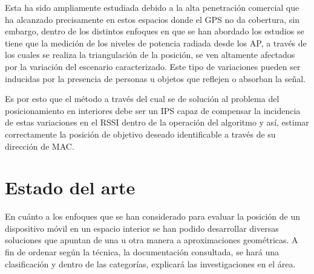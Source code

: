 Esta ha sido ampliamente estudiada debido a la alta penetración comercial que ha alcanzado precisamente en estos espacios donde el GPS no da cobertura, sin embargo, dentro de los distintos enfoques en que se han abordado los estudios se tiene que la medición de los niveles de potencia radiada desde los \ac{AP}, a través de los cuales se realiza la triangulación de la posición, se ven altamente afectados por la variación del escenario caracterizado. Este tipo de variaciones pueden ser inducidas por la presencia de personas u objetos que reflejen o absorban la señal.

Es por esto que el método a través del cual se de solución al problema del posicionamiento en interiores debe ser un \ac{IPS} capaz de compensar la incidencia de estas variaciones en el \ac{RSSI} dentro de la operación del algoritmo y así, estimar correctamente la posición de objetivo deseado identificable a través de su dirección de \ac{MAC}.

\section{Estado del arte}

En cuánto a los enfoques que se han considerado para evaluar la posición de un dispositivo móvil en un espacio interior se han podido desarrollar diversas soluciones que apuntan de una u otra manera a aproximaciones geométricas. A fin de ordenar según la técnica, la documentación consultada, se hará una clasificación y dentro de las categorías, explicará las investigaciones en el área.\\

                \clearpage 


